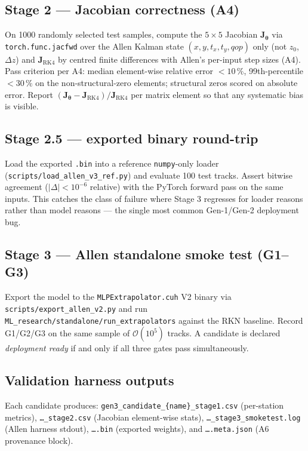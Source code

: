 \documentclass[a4paper,11pt]{article}
\newcommand{\num}[1]{#1}
\newcommand{\dz}{\Delta z}
\newcommand{\Jac}{\mathbf{J}}
\newcommand{\btheta}{\bm{\theta}}
\begin{document}
\subsection{Stage 2 --- Jacobian correctness (A4)}

On \num{1000} randomly selected test samples, compute the
$5\times 5$ Jacobian $\Jac_{\btheta}$ via
\texttt{torch.func.jacfwd} over the Allen Kalman state
$(x,y,t_x,t_y,qop)$ only (not $z_0$, $\dz$) and
$\Jac_\mathrm{RK4}$ by centred finite differences with Allen's
per-input step sizes (A4).  Pass criterion per A4: median
element-wise relative error $<10\,\%$, 99th-percentile $<30\,\%$
on the non-structural-zero elements; structural zeros scored on
absolute error.  Report $(\Jac_{\btheta} -
\Jac_\mathrm{RK4})/\Jac_\mathrm{RK4}$ per matrix element so that
any systematic bias is visible.

\subsection{Stage 2.5 --- exported binary round-trip}

Load the exported \texttt{.bin} into a reference
\texttt{numpy}-only loader
(\texttt{scripts/load\_allen\_v3\_ref.py}) and evaluate 100 test
tracks.  Assert bitwise agreement ($|\Delta| < 10^{-6}$ relative)
with the PyTorch forward pass on the same inputs.  This catches the
class of failure where Stage 3 regresses for loader reasons rather
than model reasons --- the single most common Gen-1/Gen-2 deployment
bug.

\subsection{Stage 3 --- Allen standalone smoke test (G1--G3)}

Export the model to the \texttt{MLPExtrapolator.cuh} V2 binary via
\texttt{scripts/export\_allen\_v2.py} and run
\texttt{ML\_research/standalone/run\_extrapolators} against the RKN
baseline.  Record G1/G2/G3 on the same sample of
$\mathcal{O}(10^5)$ tracks.  A candidate is declared \emph{deployment
ready} if and only if all three gates pass simultaneously.

\subsection{Validation harness outputs}

Each candidate produces:
\texttt{gen3\_candidate\_\{name\}\_stage1.csv} (per-station metrics),
\texttt{\dots\_stage2.csv} (Jacobian element-wise stats),
\texttt{\dots\_stage3\_smoketest.log} (Allen harness stdout),
\texttt{\dots.bin} (exported weights), and
\texttt{\dots.meta.json} (A6 provenance block).
\end{document}
